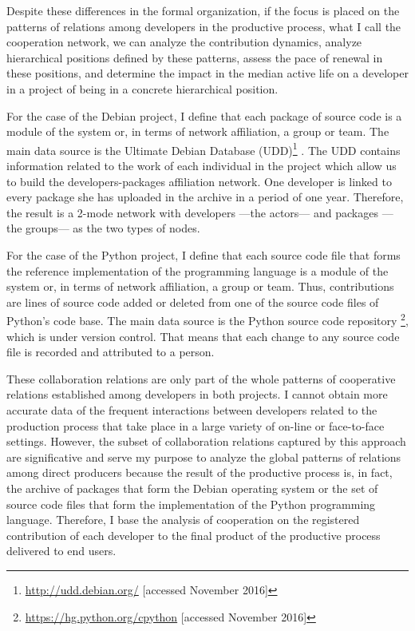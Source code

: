 Despite these differences in the formal organization, if the focus is placed on the patterns of relations among developers in the productive process, what I call the cooperation network, we can analyze the contribution dynamics, analyze hierarchical positions defined by these patterns, assess the pace of renewal in these positions, and determine the impact in the median active life on a developer in a project of being in a concrete hierarchical position.

For the case of the Debian project, I define that each package of source code is a module of the system or, in terms of network affiliation, a group or team. The main data source is the Ultimate Debian Database (UDD)\footnote{\href{http://udd.debian.org/}{http://udd.debian.org/} [accessed November 2016]} \citep{udd:2010}. The UDD contains information related to the work of each individual in the project which allow us to build the developers-packages affiliation network. One developer is linked to every package she has uploaded in the archive in a period of one year. Therefore, the result is a 2-mode network with developers ---the actors--- and packages ---the groups--- as the two types of nodes.

For the case of the Python project, I define that each source code file that forms the reference implementation of the programming language is a module of the system or, in terms of network affiliation, a group or team. Thus, contributions are lines of source code added or deleted from one of the source code files of Python's code base. The main data source is the Python source code repository \footnote{\href{https://hg.python.org/cpython}{https://hg.python.org/cpython} [accessed November 2016]}, which is under version control. That means that each change to any source code file is recorded and attributed to a person.

These collaboration relations are only part of the whole patterns of cooperative relations established among developers in both projects. I cannot obtain more accurate data of the frequent interactions between developers related to the production process that take place in a large variety of on-line or face-to-face settings. However, the subset of collaboration relations captured by this approach are significative and serve my purpose to analyze the global patterns of relations among direct producers because the result of the productive process is, in fact, the archive of packages that form the Debian operating system or the set of source code files that form the implementation of the Python programming language. Therefore, I base the analysis of cooperation on the registered contribution of each developer to the final product of the productive process delivered to end users.

